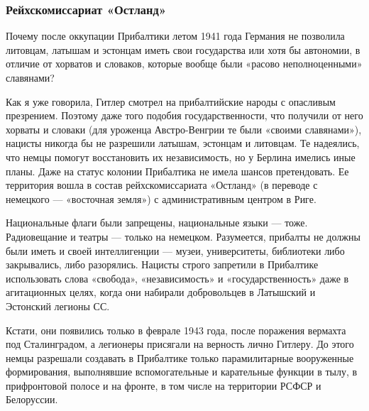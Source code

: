  
 
 
 
 
\clearpage
\subsubsection{Рейхскомиссариат «Остланд»}
\label{sec:02_12_2020.news.ru.lenta_ru.mozzhuhin_andrei.1.pribaltika.reichs_kommisariat_ostland}

Почему после оккупации Прибалтики летом 1941 года Германия не позволила
литовцам, латышам и эстонцам иметь свои государства или хотя бы автономии, в
отличие от хорватов и словаков, которые вообще были «расово неполноценными»
славянами?

Как я уже говорила, Гитлер смотрел на прибалтийские народы с опасливым
презрением. Поэтому даже того подобия государственности, что получили от него
хорваты и словаки (для уроженца Австро-Венгрии те были «своими славянами»),
нацисты никогда бы не разрешили латышам, эстонцам и литовцам. Те надеялись, что
немцы помогут восстановить их независимость, но у Берлина имелись иные планы.
Даже на статус колонии Прибалтика не имела шансов претендовать. Ее территория
вошла в состав рейхскомиссариата «Остланд» (в переводе с немецкого — «восточная
земля») с административным центром в Риге.

Национальные флаги были запрещены, национальные языки — тоже. Радиовещание и
театры — только на немецком. Разумеется, прибалты не должны были иметь и своей
интеллигенции — музеи, университеты, библиотеки либо закрывались, либо
разорялись. Нацисты строго запретили в Прибалтике использовать слова «свобода»,
«независимость» и «государственность» даже в агитационных целях, когда они
набирали добровольцев в Латышский и Эстонский легионы СС.

Кстати, они появились только в феврале 1943 года, после поражения вермахта под
Сталинградом, а легионеры присягали на верность лично Гитлеру. До этого немцы
разрешали создавать в Прибалтике только парамилитарные вооруженные
формирования, выполнявшие вспомогательные и карательные функции в тылу, в
прифронтовой полосе и на фронте, в том числе на территории РСФСР и Белоруссии.

